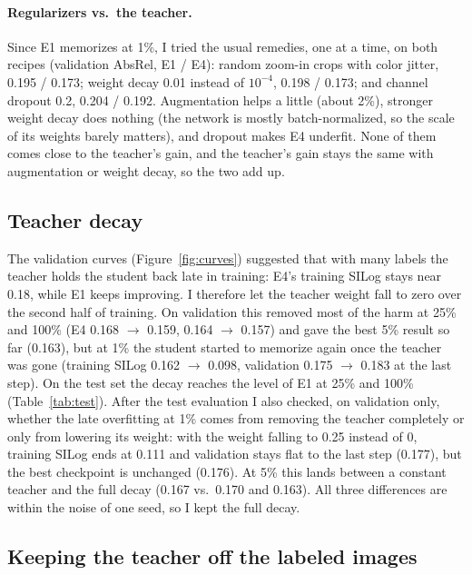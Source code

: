 \documentclass[11pt]{article}
\begin{document}
\paragraph{Regularizers vs.\ the teacher.} Since E1 memorizes at 1\%, I tried the usual remedies,
one at a time, on both recipes (validation AbsRel, E1 / E4): random zoom-in crops with color
jitter, 0.195 / 0.173; weight decay 0.01 instead of $10^{-4}$, 0.198 / 0.173; and channel dropout
0.2, 0.204 / 0.192. Augmentation helps a little (about 2\%), stronger weight decay does nothing
(the network is mostly batch-normalized, so the scale of its weights barely matters), and dropout
makes E4 underfit. None of them comes close to the teacher's gain, and the teacher's gain stays the
same with augmentation or weight decay, so the two add up.

\subsection{Teacher decay}
\label{sec:decay}

The validation curves (Figure~\ref{fig:curves}) suggested that with many labels the teacher holds
the student back late in training: E4's training SILog stays near 0.18, while E1 keeps improving.
I therefore let the teacher weight fall to zero over the second half of training. On validation
this removed most of the harm at 25\% and 100\% (E4 0.168 $\to$ 0.159, 0.164 $\to$ 0.157) and gave
the best 5\% result so far (0.163), but at 1\% the student started to memorize again once the
teacher was gone (training SILog 0.162 $\to$ 0.098, validation 0.175 $\to$ 0.183 at the last step).
On the test set the decay reaches the level of E1 at 25\% and 100\% (Table~\ref{tab:test}).
After the test evaluation I also checked, on validation only, whether the late overfitting at 1\%
comes from removing the teacher completely or only from lowering its weight: with the weight
falling to 0.25 instead of 0, training SILog ends at 0.111 and validation stays flat to the last
step (0.177), but the best checkpoint is unchanged (0.176). At 5\% this lands between a constant
teacher and the full decay (0.167 vs.\ 0.170 and 0.163). All three differences are within the noise
of one seed, so I kept the full decay.

\subsection{Keeping the teacher off the labeled images}
\label{sec:gtmask}
\end{document}
